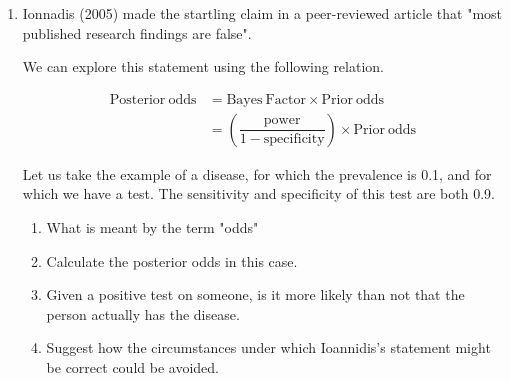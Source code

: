 \documentclass[a4paper,12pt,fleqn]{article}
\begin{document}
\begin{enumerate}[label=\alph*)]
	
	
	\item Ionnadis (2005) made the startling claim in a peer-reviewed article that "most published research findings are false". 
	
	We can explore this statement using the following relation. 
	
	\begin{align*}
	\mathrm{Posterior\ odds} &= \mathrm{Bayes\ Factor}\times\mathrm{Prior\ odds}\\
	&=\left(\dfrac{\mathrm{power}}{\mathrm{1-specificity}}\right)\times\mathrm{Prior\ odds}
	\end{align*}
	
	Let us take the example of a disease, for which the prevalence is 0.1, and for which we have a test. The sensitivity and specificity of this test are both 0.9. 
	
	\begin{enumerate}[label=\roman*)]
	\item What is meant by the term "odds"
	\item Calculate the posterior odds in this case.
	\item Given a positive test on someone, is it more likely than not that the person actually has the disease.
	\item Suggest  how the circumstances under which Ioannidis's statement might be correct could be avoided.
	
	\end{enumerate}
\end{enumerate}

\label{finalpage}

\end{document}
